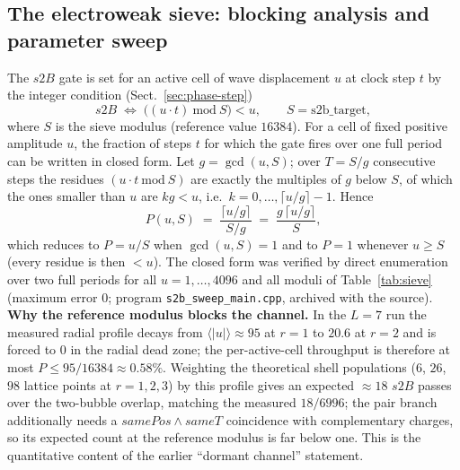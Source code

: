 \documentclass{ijuc}
\begin{document}
\subsection{The electroweak sieve: blocking analysis and parameter sweep}\label{subsec:s2b-sweep}
The $s2B$ gate is set for an active cell of wave displacement $u$ at clock step $t$ by the integer condition (Sect.~\ref{sec:phase-step})
\begin{equation}
s2B \;\Longleftrightarrow\; \big((u\cdot t)\ \mathrm{mod}\ S\big) < u , \qquad S=\mathrm{s2b\_target},
\label{eq:sieve}
\end{equation}
where $S$ is the sieve modulus (reference value $16384$).  For a cell of fixed positive amplitude $u$, the fraction of steps $t$ for which the gate fires over one full period can be written in closed form.  Let $g=\gcd(u,S)$; over $T=S/g$ consecutive steps the residues $(u\cdot t\ \mathrm{mod}\ S)$ are exactly the multiples of $g$ below $S$, of which the ones smaller than $u$ are $k g<u$, i.e.\ $k=0,\dots,\lceil u/g\rceil-1$.  Hence
\begin{equation}
P(u,S) \;=\; \frac{\lceil u/g\rceil}{S/g} \;=\; \frac{g\,\lceil u/g\rceil}{S},
\label{eq:sieve-prob}
\end{equation}
which reduces to $P=u/S$ when $\gcd(u,S)=1$ and to $P=1$ whenever $u\ge S$ (every residue is then $<u$).  The closed form was verified by direct enumeration over two full periods for all $u=1,\dots,4096$ and all moduli of Table~\ref{tab:sieve} (maximum error $0$; program \texttt{s2b\_sweep\_main.cpp}, archived with the source).
\textbf{Why the reference modulus blocks the channel.}  In the $L=7$ run the measured radial profile decays from $\langle|u|\rangle\approx95$ at $r=1$ to $20.6$ at $r=2$ and is forced to $0$ in the radial dead zone; the per-active-cell throughput is therefore at most $P\le95/16384\approx0.58\%$.  Weighting the theoretical shell populations ($6$, $26$, $98$ lattice points at $r=1,2,3$) by this profile gives an expected $\approx18$ $s2B$ passes over the two-bubble overlap, matching the measured $18/6996$; the pair branch additionally needs a $samePos\wedge sameT$ coincidence with complementary charges, so its expected count at the reference modulus is far below one.  This is the quantitative content of the earlier ``dormant channel'' statement.
\end{document}
